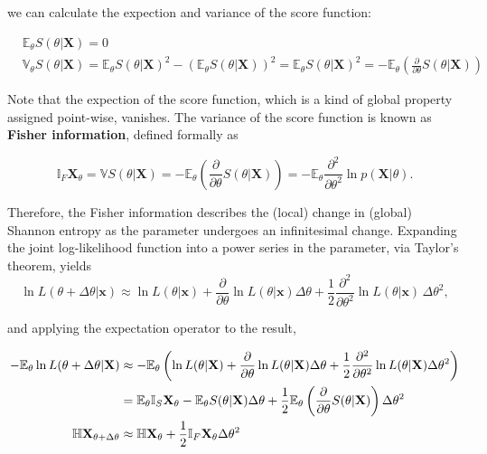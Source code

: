 \documentclass[12pt, twoside, draft]{article}
\begin{document}
we can calculate the expection and variance of the score function:

\begin{align}
&\mathbb{E}_\theta S(\theta | \mathbf{X}) = 0 \\
&\mathbb{V}_{\theta} S(\theta | \mathbf{X}) = \mathbb{E}_\theta S(\theta | \mathbf{X})^2 - \left( \mathbb{E}_\theta S(\theta | \mathbf{X}) \right)^2 = \mathbb{E}_\theta S(\theta | \mathbf{X})^2 = -\mathbb{E}_{\theta} \left( \frac{\partial}{\partial \theta} S(\theta | \mathbf{X}) \right)
\end{align}

Note that the expection of the score function, which is a kind of global property assigned point-wise, vanishes.  The variance of the score function is known as \textbf{Fisher information}, defined formally as

\begin{equation}\label{eq:Fisher_information}
\mathbb{I}_F \mathbf{X}_{\theta} = \mathbb{V} S(\theta | \mathbf{X}) = -\mathbb{E}_{\theta} \left( \frac{\partial}{\partial \theta} S(\theta | \mathbf{X}) \right) = -\mathbb{E}_\theta \frac{\partial^2}{\partial \theta^2} \ln p(\mathbf{X} | \theta).
\end{equation}

Therefore, the Fisher information describes the (local) change in (global) Shannon entropy as the parameter undergoes an infinitesimal change.   Expanding the joint log-likelihood function into a power series in the parameter, via Taylor's theorem, yields
\begin{equation}
\ln L(\theta + \Delta \theta | \mathbf{x}) \approx \ln L(\theta | \mathbf{x}) + \frac{\partial}{\partial \theta} \ln L(\theta | \mathbf{x}) \Delta\theta + \frac{1}{2} \frac{\partial^2}{\partial \theta^2} \ln L(\theta | \mathbf{x})\, \Delta\theta^2,
\end{equation}

and applying the expectation operator to the result,

\begin{align}
-\mathbb{E}_\theta \ln L(\theta + \Delta \theta | \mathbf{X}) &\approx -\mathbb{E}_\theta \left( \ln L(\theta | \mathbf{X})  + \frac{\partial}{\partial \theta} \ln L(\theta | \mathbf{X})  \Delta \theta + \frac{1}{2} \frac{\partial^2}{\partial \theta^2} \ln L (\theta | \mathbf{X}) \Delta \theta^2 \right) \notag \\
&= \mathbb{E}_\theta \mathbb{I}_S \mathbf{X}_\theta - \mathbb{E}_\theta S(\theta | \mathbf{X}) \Delta \theta + \frac{1}{2} \mathbb{E}_\theta \left( \frac{\partial}{\partial \theta} S(\theta | \mathbf{X}) \right) \Delta \theta^2 \notag \\
\mathbb{H} \mathbf{X}_{\theta + \Delta \theta} &\approx \mathbb{H} \mathbf{X}_\theta + \frac{1}{2} \mathbb{I}_F \mathbf{X}_\theta \Delta \theta^2
\end{align}
\end{document}

